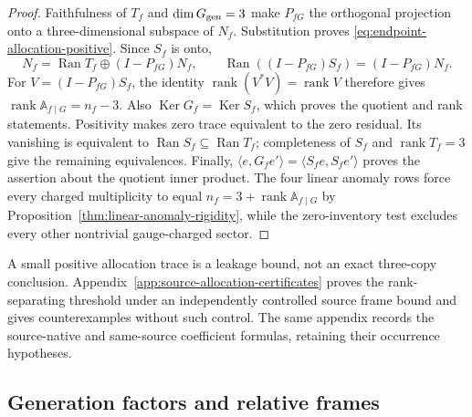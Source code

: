 \documentclass[11pt]{article}
\numberwithin{equation}{section}
\theoremstyle{definition}
\theoremstyle{remark}
\newcommand{\rank}{\operatorname{rank}}
\newcommand{\Ker}{\operatorname{Ker}}
\newcommand{\Ran}{\operatorname{Ran}}
\begin{document}
\begin{proof}
Faithfulness of $T_f$ and $\dim G_{\rm gen}=3$ make $P_{fG}$ the orthogonal
projection onto a three-dimensional subspace of $N_f$.  Substitution proves
\eqref{eq:endpoint-allocation-positive}.  Since $S_f$ is onto,
\[
 N_f=\Ran T_f\oplus(I-P_{fG})N_f,\qquad
 \Ran((I-P_{fG})S_f)=(I-P_{fG})N_f.
\]
For $V=(I-P_{fG})S_f$, the identity $\rank(V^*V)=\rank V$ therefore gives
$\rank\mathbb A_{f\mid G}=n_f-3$.  Also
$\Ker G_f=\Ker S_f$, which proves the quotient and rank statements.
Positivity makes zero trace equivalent to the zero residual.  Its vanishing
is equivalent to $\Ran S_f\subseteq\Ran T_f$; completeness of $S_f$ and
$\rank T_f=3$ give the remaining equivalences.  Finally,
$\langle e,G_fe'\rangle=\langle S_fe,S_fe'\rangle$ proves the assertion
about the quotient inner product.
The four linear anomaly rows force every charged multiplicity to equal
$n_f=3+\rank\mathbb A_{f\mid G}$ by
Proposition~\ref{thm:linear-anomaly-rigidity}, while the zero-inventory test
excludes every other nontrivial gauge-charged sector.
\end{proof}

A small positive allocation trace is a leakage bound, not an exact
three-copy conclusion.  Appendix~\ref{app:source-allocation-certificates}
proves the rank-separating threshold under an independently controlled
source frame bound and gives counterexamples without such control.
The same appendix records the source-native and same-source coefficient
formulas, retaining their occurrence hypotheses.


\subsection{Generation factors and relative frames}
\end{document}
